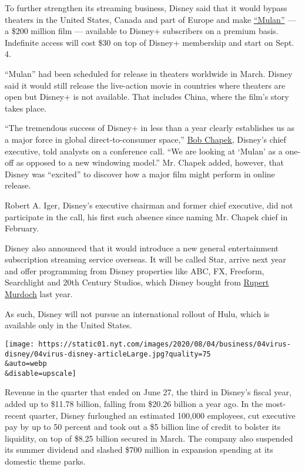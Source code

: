 To further strengthen its streaming business, Disney said that it would
bypass theaters in the United States, Canada and part of Europe and make
\href{https://www.nytimes.com/2020/06/12/business/media/tenet-release-delayed.html?searchResultPosition=1}{``Mulan''}
--- a \$200 million film --- available to Disney+ subscribers on a
premium basis. Indefinite access will cost \$30 on top of Disney+
membership and start on Sept. 4.

``Mulan'' had been scheduled for release in theaters worldwide in March.
Disney said it would still release the live-action movie in countries
where theaters are open but Disney+ is not available. That includes
China, where the film's story takes place.

``The tremendous success of Disney+ in less than a year clearly
establishes us as a major force in global direct-to-consumer space,''
\href{https://www.nytimes.com/2020/02/26/business/media/bob-chapek-disney-ceo.html?searchResultPosition=8}{Bob
Chapek}, Disney's chief executive, told analysts on a conference call.
``We are looking at `Mulan' as a one-off as opposed to a new windowing
model.'' Mr. Chapek added, however, that Disney was ``excited'' to
discover how a major film might perform in online release.

Robert A. Iger, Disney's executive chairman and former chief executive,
did not participate in the call, his first such absence since naming Mr.
Chapek chief in February.

Disney also announced that it would introduce a new general
entertainment subscription streaming service overseas. It will be called
Star, arrive next year and offer programming from Disney properties like
ABC, FX, Freeform, Searchlight and 20th Century Studios, which Disney
bought from
\href{https://www.nytimes.com/2019/03/20/business/media/walt-disney-21st-century-fox-deal.html}{Rupert
Murdoch} last year.

As such, Disney will not pursue an international rollout of Hulu, which
is available only in the United States.

\texttt{[image: https://static01.nyt.com/images/2020/08/04/business/04virus-disney/04virus-disney-articleLarge.jpg?quality=75\\\&auto=webp\\\&disable=upscale]}

Revenue in the quarter that ended on June 27, the third in Disney's
fiscal year, added up to \$11.78 billion, falling from \$20.26 billion a
year ago. In the most-recent quarter, Disney furloughed an estimated
100,000 employees, cut executive pay by up to 50 percent and took out a
\$5 billion line of credit to bolster its liquidity, on top of \$8.25
billion secured in March. The company also suspended its summer dividend
and slashed \$700 million in expansion spending at its domestic theme
parks.

